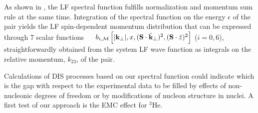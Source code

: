 { As shown in \cite{PhysRevC.95.014001, Pace:2013bq,Scopetta:2014yoa, Pace:2016eiq}, the LF
 spectral function  
fulfills {normalization and momentum sum rule  at the same time. Integration of the spectral function on the energy 
$\epsilon$ 
of the pair yields the LF spin-dependent momentum distribution that
can  be expressed through 7 scalar functions ~~ {{${b}_{i,{\cal M}}\left [ |{\bf k}_{\perp}|,x,({\bf  S}\cdot \hat {\bf k}_{\perp})^2,({\bf  S} \cdot {\hat z})^2 \right] $}}} ($i=0,6$), straightforwardly obtained from the system LF wave function as integrals on the relative momentum, $k_{23}$, of the pair.

{{Calculations of DIS 
 processes  based on our spectral function could indicate which is the gap with respect to the experimental data to be filled by effects of non-nucleonic degrees of freedom or by modifications of nucleon structure in nuclei.}}
 {A first test of our approach is the EMC effect for $^3\mathrm{He}$.} 

}
